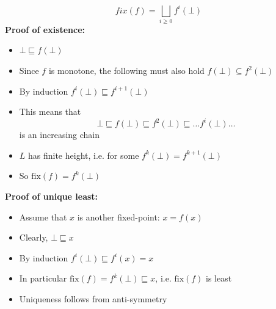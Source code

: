 \begin{itemize}
  \begin{equation*}
    fix(f) = \bigsqcup _{i \geq 0} f^i(\bot)
  \end{equation*}
  	\textbf{Proof of existence:} 
    \begin{itemize}
    	\item $\bot \sqsubseteq f(\bot)$
    	\item Since $f$ is monotone, the following must also hold $f(\bot) \subseteq f^2(\bot)$
      \item By induction $f^i(\bot) \sqsubseteq f^{i+1}(\bot)$
      \item This means that
      \begin{equation*}
        \bot \sqsubseteq f(\bot) \sqsubseteq f^2(\bot) \sqsubseteq \dots f^i(\bot) \dots
      \end{equation*}
      is an increasing chain
      \item $L$ has finite height, i.e. for some $f^k(\bot) = f^{k+1}(\bot)$
      \item So $\text{fix}(f) = f^k(\bot)$ 
    \end{itemize}
  	\textbf{Proof of unique least:}
    \begin{itemize}
    	\item Assume that $x$ is another fixed-point: $x = f(x)$
      \item Clearly, $\bot \sqsubseteq x$
      \item By induction $f^i(\bot) \sqsubseteq f^i(x) = x$
      \item In particular $\text{fix}(f) = f^k(\bot) \sqsubseteq x$, i.e. $\text{fix}(f)$ is least
      \item Uniqueness follows from anti-symmetry
    \end{itemize}
\end{itemize}

